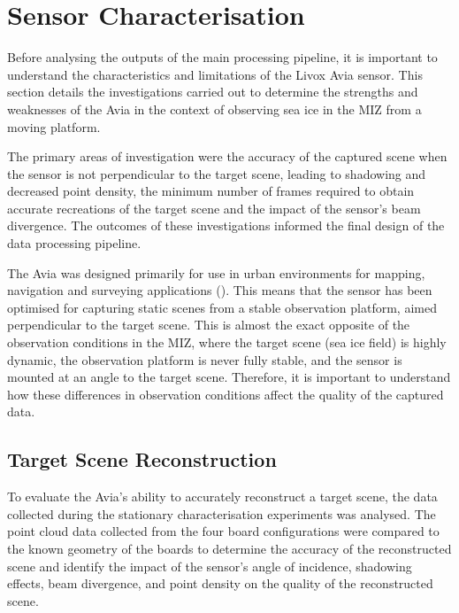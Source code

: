 \section{Sensor Characterisation}
\label{sec:ch5.section2}

Before analysing the outputs of the main processing pipeline, it is important to understand the characteristics and limitations of the Livox Avia sensor. This section details the investigations carried out to determine the strengths and weaknesses of the Avia in the context of observing sea ice in the \ac{MIZ} from a moving platform.

The primary areas of investigation were the accuracy of the captured scene when the sensor is not perpendicular to the target scene, leading to shadowing and decreased point density, the minimum number of frames required to obtain accurate recreations of the target scene and the impact of the sensor's beam divergence. The outcomes of these investigations informed the final design of the data processing pipeline.

The Avia was designed primarily for use in urban environments for mapping, navigation and surveying applications (\cite{AviaLiDARSensor}). This means that the sensor has been optimised for capturing static scenes from a stable observation platform, aimed perpendicular to the target scene. This is almost the exact opposite of the observation conditions in the \ac{MIZ}, where the target scene (sea ice field) is highly dynamic, the observation platform is never fully stable, and the sensor is mounted at an angle to the target scene. Therefore, it is important to understand how these differences in observation conditions affect the quality of the captured data.

\subsection{Target Scene Reconstruction}
\label{subsec:ch5.section2.subsec1}

To evaluate the Avia's ability to accurately reconstruct a target scene, the data collected during the stationary characterisation experiments was analysed. The point cloud data collected from the four board configurations were compared to the known geometry of the boards to determine the accuracy of the reconstructed scene and identify the impact of the sensor's angle of incidence, shadowing effects, beam divergence, and point density on the quality of the reconstructed scene.

